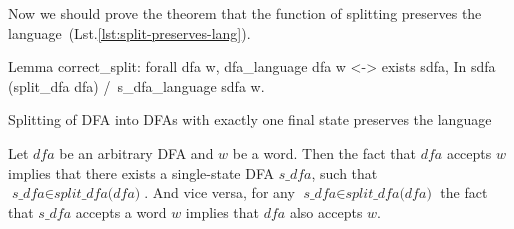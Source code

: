 







Now we should prove the theorem that the function of splitting preserves the language~(Lst.\ref{lst:split-preserves-lang}).

\begin{listing}[h]
    \begin{pyglist}[language=coq, numbers=none, numbersep=5pt]
  Lemma correct_split:
    forall dfa w,
      dfa_language dfa w <->
      exists sdfa, 
         In sdfa (split_dfa dfa) /\ 
         s_dfa_language sdfa w.
    \end{pyglist}
    \caption{Splitting of DFA into DFAs with exactly one final state preserves the language}
    \label{lst:split-preserves-lang}
\end{listing}

\begin{theorem}
  Let $\textit{dfa}$ be an arbitrary DFA and $w$ be a word. Then the fact that $\textit{dfa}$ accepts $w$ implies that there exists a single-state DFA $\textit{s\_dfa}$, such that $\textit{s\_dfa} \in \textit{split\_dfa(dfa)}$. And vice versa, for any $\textit{s\_dfa} \in \textit{split\_dfa(dfa)}$ the fact that $\textit{s\_dfa}$ accepts a word $w$ implies that $\textit{dfa}$ also accepts $w$.
\end{theorem}

